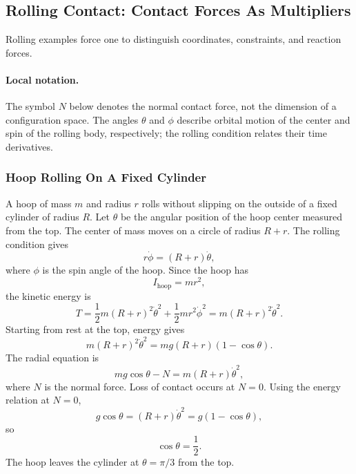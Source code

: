 \subsection{Rolling Contact: Contact Forces As Multipliers}
\label{sec:lab-rolling-contact}

Rolling examples force one to distinguish coordinates, constraints, and
reaction forces.

\paragraph{Local notation.}
The symbol \(N\) below denotes the normal contact force, not the dimension of a
configuration space.  The angles \(\theta\) and \(\phi\) describe orbital
motion of the center and spin of the rolling body, respectively; the rolling
condition relates their time derivatives.

\subsubsection{Hoop Rolling On A Fixed Cylinder}

A hoop of mass \(m\) and radius \(r\) rolls without slipping on the outside of a
fixed cylinder of radius \(R\). Let \(\theta\) be the angular position of the
hoop center measured from the top. The center of mass moves on a circle of
radius \(R+r\). The rolling condition gives
\[
  r\dot\phi=(R+r)\dot\theta,
\]
where \(\phi\) is the spin angle of the hoop. Since the hoop has
\[
  I_{\mathrm{hoop}}=mr^2,
\]
the kinetic energy is
\[
  T=
  \frac12m(R+r)^2\dot\theta^2
  +
  \frac12mr^2\dot\phi^2
  =
  m(R+r)^2\dot\theta^2.
\]
Starting from rest at the top, energy gives
\[
  m(R+r)^2\dot\theta^2
  =
  mg(R+r)(1-\cos\theta).
\]
The radial equation is
\[
  mg\cos\theta-N=m(R+r)\dot\theta^2,
\]
where \(N\) is the normal force. Loss of contact occurs at \(N=0\). Using the
energy relation at \(N=0\),
\[
  g\cos\theta=(R+r)\dot\theta^2
  =
  g(1-\cos\theta),
\]
so
\[
  \boxed{\cos\theta=\frac12.}
\]
The hoop leaves the cylinder at \(\theta=\pi/3\) from the top.

